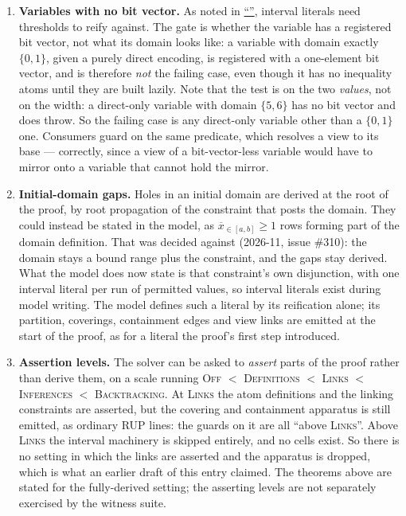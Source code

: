 \documentclass[11pt,a4paper]{article}
\theoremstyle{plain}
\theoremstyle{definition}
\theoremstyle{remark}
\newcommand{\natin}[3]{\overline{#1}_{\in[#2,#3]}}
\newcommand{\nsec}[1]{\hyperref[#1]{``\nameref*{#1}''}}
\begin{document}
\begin{enumerate}[itemsep=3pt]

\item \textbf{Variables with no bit vector.}  As noted in
  \nsec{sec:notprovided}, interval literals need thresholds to reify against.  The
  gate is whether the variable has a registered bit vector, not what its domain
  looks like: a variable with domain exactly $\{0,1\}$, given a purely direct
  encoding, is registered with a one-element bit vector, and is therefore
  \emph{not} the failing case, even though it has no inequality atoms until
  they are built lazily.  Note that the test is on the two \emph{values}, not
  on the width: a direct-only variable with domain $\{5,6\}$ has no bit vector
  and does throw.  So the failing case is any direct-only variable other than a
  $\{0,1\}$ one.  Consumers guard on the
  same predicate, which resolves a view to its base --- correctly, since a view
  of a bit-vector-less variable would have to mirror onto a variable that cannot
  hold the mirror.

\item \textbf{Initial-domain gaps.}  Holes in an initial domain are
  derived at the root of the proof, by root propagation of the constraint that
  posts the domain.  They could instead be stated in the model, as
  $\natin{x}{a}{b}\geq 1$ rows forming part of the domain definition.
  That was decided against (2026-11, issue \#310): the domain stays a bound
  range plus the constraint, and the gaps stay derived.  What the model does
  now state is that constraint's own disjunction, with one interval literal per
  run of permitted values, so interval literals exist during model writing.
  The model defines such a literal by its reification alone; its partition,
  coverings, containment edges and view links are emitted at the start of the
  proof, as for a literal the proof's first step introduced.

\item \textbf{Assertion levels.}  The solver can be asked to \emph{assert} parts
  of the proof rather than derive them, on a scale running
  \textsc{Off} $<$ \textsc{Definitions} $<$ \textsc{Links} $<$
  \textsc{Inferences} $<$ \textsc{Backtracking}.  At \textsc{Links} the atom
  definitions and the linking constraints are asserted, but the covering and
  containment apparatus is still emitted, as ordinary RUP lines: the guards on
  it are all ``above \textsc{Links}''.  Above \textsc{Links} the interval
  machinery is skipped entirely, and no cells exist.  So there is no setting in
  which the links are asserted and the apparatus is dropped, which is what an
  earlier draft of this entry claimed.  The theorems above are stated for the
  fully-derived setting; the asserting levels are not separately exercised by the
  witness suite.


\end{enumerate}
\end{document}
